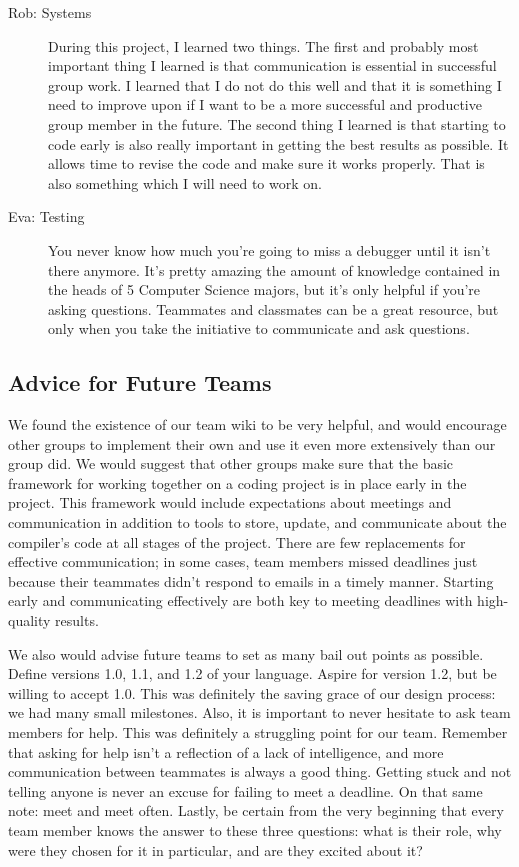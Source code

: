 \begin{description}
\item[Rob: Systems] During this project, I learned two things. The
  first and probably most important thing I learned is that
  communication is essential in successful group work. I learned
  that I do not do this well and that it is something I need to
  improve upon if I want to be a more successful and productive group
  member in the future. The second thing I learned is that starting to
  code early is also really important in getting the best results as
  possible. It allows time to revise the code and make sure it works
  properly. That is also something which I will need to work on.

\item[Eva: Testing] You never know how much you're going to miss a
  debugger until it isn't there anymore.  It's pretty amazing the
  amount of knowledge contained in the heads of 5 Computer Science
  majors, but it's only helpful if you're asking questions.  Teammates
  and classmates can be a great resource, but only when you take the
  initiative to communicate and ask questions.
\end{description}

\subsection{Advice for Future Teams}
We found the existence of our team wiki to be very helpful, and would
encourage other groups to implement their own and use it even more
extensively than our group did. We would suggest that other groups
make sure that the basic framework for working together on a coding
project is in place early in the project. This framework would include
expectations about meetings and communication in addition to tools to
store, update, and communicate about the compiler’s code at all stages
of the project. There are few replacements for effective
communication; in some cases, team members missed deadlines just
because their teammates didn't respond to emails in a timely
manner. Starting early and communicating effectively are both key to
meeting deadlines with high-quality results.

We also would advise future teams to set as many bail out points as
possible. Define versions 1.0, 1.1, and 1.2 of your language. Aspire
for version 1.2, but be willing to accept 1.0. This was definitely the
saving grace of our design process: we had many small
milestones. Also, it is important to never hesitate to ask team
members for help. This was definitely a struggling point for our
team. Remember that asking for help isn’t a reflection of a lack of
intelligence, and more communication between teammates is always a
good thing. Getting stuck and not telling anyone is never an excuse
for failing to meet a deadline. On that same note: meet and meet
often. Lastly, be certain from the very beginning that every team
member knows the answer to these three questions: what is their role,
why were they chosen for it in particular, and are they excited about
it?

